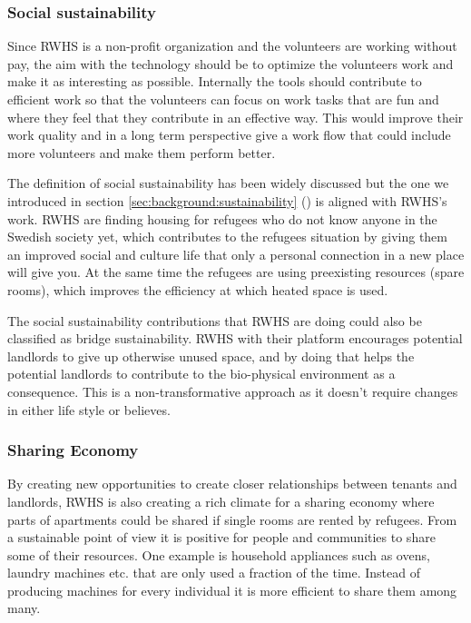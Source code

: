 \subsubsection{Social sustainability}
\label{sec:discussion:social-sustainability}
Since RWHS is a non-profit organization and the volunteers are working without pay, the aim with the technology should be to optimize the volunteers work and make it as interesting as possible. Internally the tools should contribute to efficient work so that the volunteers can focus on work tasks that are fun and where they feel that they contribute in an effective way. This would improve their work quality and in a long term perspective give a work flow that could include more volunteers and make them perform better.

The definition of social sustainability has been widely discussed but the one we introduced in section \ref{sec:background:sustainability} (\textit{}) is aligned with RWHS's work. RWHS are finding housing for refugees who do not know anyone in the Swedish society yet, which contributes to the refugees situation by giving them an improved social and culture life that only a personal connection in a new place will give you. At the same time  the refugees are  using preexisting resources (spare rooms), which improves the efficiency at which heated space is used.

The social sustainability contributions that RWHS are doing could also be classified as bridge sustainability. RWHS with their platform encourages potential landlords to give up otherwise unused space, and by doing that helps the potential landlords to contribute to the bio-physical environment as a consequence. This is a non-transformative approach as it doesn't require changes in either life style or believes.
 
\subsubsection{Sharing Economy}
\label{sec:discussion:sharing-economy}
By creating new opportunities to create closer relationships between tenants and landlords, RWHS is also creating a rich climate for a sharing economy where parts of apartments could be shared if single rooms are rented by refugees. From a sustainable point of view it is positive for people and communities to share some of their resources. One example is household appliances such as ovens, laundry machines etc. that are only used a fraction of the time. Instead of producing machines for every individual it is more efficient to share them among many.

